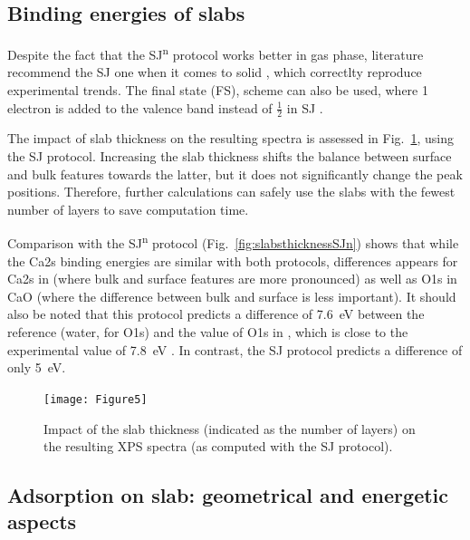 \documentclass[12pt,a4paper]{article}
\begin{document}
\clearpage
\subsection{Binding energies of slabs}

Despite the fact that the SJ\textsuperscript{n} protocol works better in gas phase, literature recommend the SJ one when it comes to solid \cite{olovssonCorelevelShiftsComplex2006}, which correctlty reproduce experimental trends. The final state (FS), scheme can also be used, where 1 electron  is added to the valence band instead of $\frac{1}{2}$ in SJ \cite{trinhEvaluatingStructureCatalysts2013a,vandenbosscheEffectsNonlocalExchange2014}.

The impact of slab thickness on the resulting spectra is assessed in Fig.~\ref{fig:slabsthickness}, using the SJ protocol. Increasing the slab thickness shifts the balance between surface and bulk features towards the latter, but it does not significantly change the peak positions. Therefore, further calculations can safely use the slabs with the fewest number of layers to save computation time. 

Comparison with the SJ\textsuperscript{n} protocol (Fig.~\ref{fig:slabsthicknessSJn}) shows that while the Ca2s binding energies are similar with both protocols, differences appears for Ca2s in  (where bulk and surface features are more pronounced) as well as O1s in CaO (where the difference between bulk and surface is less important). It should also be noted that this protocol predicts a difference of \SI{7.6}{\electronvolt} between the reference (water, for O1s) and the value of O1s in , which is close to the experimental value of \SI{7.8}{\electronvolt} \cite{cristHandbookMonochromaticXPS1999}. In contrast, the SJ protocol predicts a difference of only \SI{5}{\electronvolt}.


\begin{figure}[!h]
	\centering
	\texttt{[image: Figure5]}
	\caption{Impact of the slab thickness (indicated as the number of layers) on the resulting XPS spectra (as computed with the SJ protocol).}
	\label{fig:slabsthickness}
\end{figure}


\subsection{Adsorption on slab: geometrical and energetic aspects}
\end{document}
